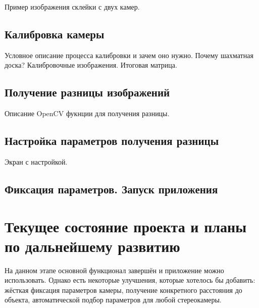 Пример изображения склейки с двух камер.

\subsection{Калибровка камеры}

Условное описание процесса калибровки и зачем оно нужно. Почему шахматная доска? Калибровочные изображения. Итоговая матрица.

\subsection{Получение разницы изображений}

Описание OpenCV фукнции для получения разницы.

\subsection{Настройка параметров получения разницы}

Экран с настройкой.

\subsection{Фиксация параметров. Запуск приложения}

\section{Текущее состояние проекта и планы по дальнейшему развитию}

На данном этапе основной функционал завершён и приложение можно использовать. Однако есть некоторые улучшения, которые хотелось бы добавить: жёсткая фиксация параметров камеры, получение конкретного расстояния до объекта, автоматической подбор параметров для любой стереокамеры. 
